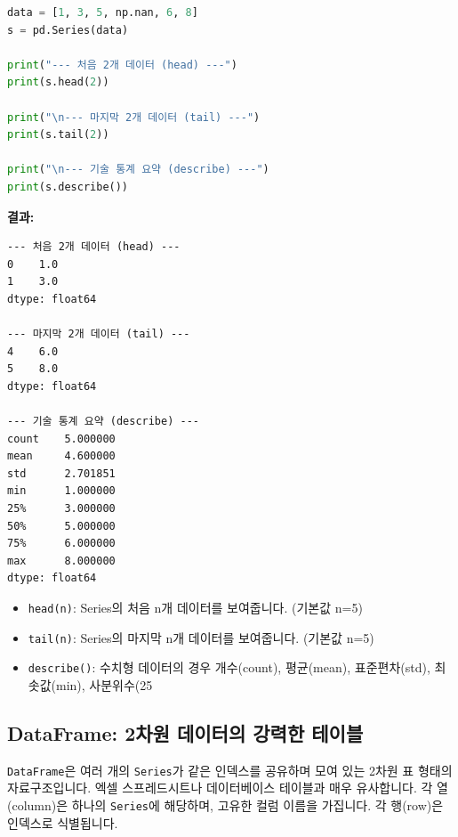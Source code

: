 \documentclass[11pt,a4paper]{book}
\theoremstyle{definition}
\begin{document}
\begin{codeexamplebox}
\begin{lstlisting}[language=Python, caption={Series 기본 메서드 사용}, label={lst:series_methods}, breaklines=true]
data = [1, 3, 5, np.nan, 6, 8]
s = pd.Series(data)

print("--- 처음 2개 데이터 (head) ---")
print(s.head(2))

print("\n--- 마지막 2개 데이터 (tail) ---")
print(s.tail(2))

print("\n--- 기술 통계 요약 (describe) ---")
print(s.describe())
\end{lstlisting}
\textbf{결과:}
\begin{verbatim}
--- 처음 2개 데이터 (head) ---
0    1.0
1    3.0
dtype: float64

--- 마지막 2개 데이터 (tail) ---
4    6.0
5    8.0
dtype: float64

--- 기술 통계 요약 (describe) ---
count    5.000000
mean     4.600000
std      2.701851
min      1.000000
25%      3.000000
50%      5.000000
75%      6.000000
max      8.000000
dtype: float64
\end{verbatim}
\end{codeexamplebox}
\begin{itemize}
    \item \texttt{head(n)}: Series의 처음 n개 데이터를 보여줍니다. (기본값 n=5)
    \item \texttt{tail(n)}: Series의 마지막 n개 데이터를 보여줍니다. (기본값 n=5)
    \item \texttt{describe()}: 수치형 데이터의 경우 개수(count), 평균(mean), 표준편차(std), 최솟값(min), 사분위수(25%
\end{itemize}


\subsection{DataFrame: 2차원 데이터의 강력한 테이블}

\begin{tcolorbox}[title={DataFrame란?}]
\texttt{DataFrame}은 여러 개의 \texttt{Series}가 같은 인덱스를 공유하며 모여 있는 2차원 표 형태의 자료구조입니다. 엑셀 스프레드시트나 데이터베이스 테이블과 매우 유사합니다. 각 열(column)은 하나의 \texttt{Series}에 해당하며, 고유한 컬럼 이름을 가집니다. 각 행(row)은 인덱스로 식별됩니다.
\end{tcolorbox}
\end{document}
